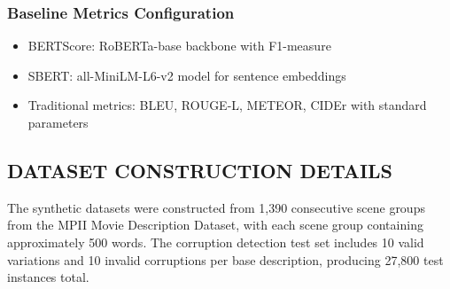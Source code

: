 \documentclass[main.tex]{subfiles}
\begin{document}
\subsubsection{Baseline Metrics Configuration}
\begin{itemize}
\item BERTScore: RoBERTa-base backbone with F1-measure
\item SBERT: all-MiniLM-L6-v2 model for sentence embeddings
\item Traditional metrics: BLEU, ROUGE-L, METEOR, CIDEr with standard parameters
\end{itemize}

\subsection{DATASET CONSTRUCTION DETAILS}

The synthetic datasets were constructed from 1,390 consecutive scene groups from the MPII Movie Description Dataset, with each scene group containing approximately 500 words. The corruption detection test set includes 10 valid variations and 10 invalid corruptions per base description, producing 27,800 test instances total.
    
\end{document}
